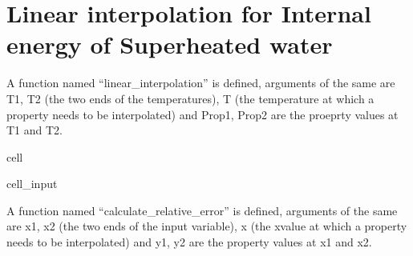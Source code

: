 \documentclass[letterpaper,10pt,english]{jupyterBook}
\begin{document}
\section{Linear interpolation for Internal energy of Superheated water}
\label{\detokenize{notebooks/Chapter4/linear-interpolation-nternal-energy:linear-interpolation-for-internal-energy-of-superheated-water}}\label{\detokenize{notebooks/Chapter4/linear-interpolation-nternal-energy::doc}}
\sphinxAtStartPar
A function named “linear\_interpolation” is defined, arguments of the same are T1, T2 (the two ends of the temperatures), T (the temperature at which a property needs to be interpolated) and Prop1, Prop2 are the proeprty values at T1 and T2.

\begin{sphinxuseclass}{cell}\begin{sphinxVerbatimInput}

\begin{sphinxuseclass}{cell_input}
\begin{sphinxVerbatim}[commandchars=\\\{\}]
     
                 
\end{sphinxVerbatim}

\end{sphinxuseclass}\end{sphinxVerbatimInput}

\end{sphinxuseclass}
\sphinxAtStartPar
A function named “calculate\_relative\_error” is defined, arguments of the same are x1, x2 (the two ends of the input variable), x (the x\sphinxhyphen{}value at which a property needs to be interpolated) and y1, y2 are the property values at x1 and x2.
\end{document}
